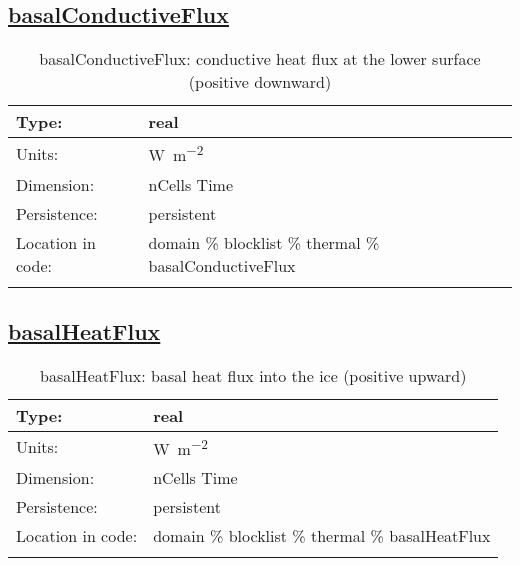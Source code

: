 \subsection[basalConductiveFlux]{\hyperref[sec:var_tab_thermal]{basalConductiveFlux}}
\label{subsec:var_sec_thermal_basalConductiveFlux}
\begin{center}
\begin{longtable}{| p{2.0in} | p{4.0in} |}
        \hline 
        Type: & real \\
        \hline 
        Units: & \si{W.m^{-2}} \\
        \hline 
        Dimension: & nCells Time \\
        \hline 
        Persistence: & persistent \\
        \hline 
         Location in code: & domain \% blocklist \% thermal \% basalConductiveFlux \\
         \hline 
    \caption{basalConductiveFlux: conductive heat flux at the lower surface (positive downward)}
\end{longtable}
\end{center}
\subsection[basalHeatFlux]{\hyperref[sec:var_tab_thermal]{basalHeatFlux}}
\label{subsec:var_sec_thermal_basalHeatFlux}
\begin{center}
\begin{longtable}{| p{2.0in} | p{4.0in} |}
        \hline 
        Type: & real \\
        \hline 
        Units: & \si{W.m^{-2}} \\
        \hline 
        Dimension: & nCells Time \\
        \hline 
        Persistence: & persistent \\
        \hline 
         Location in code: & domain \% blocklist \% thermal \% basalHeatFlux \\
         \hline 
    \caption{basalHeatFlux: basal heat flux into the ice (positive upward)}
\end{longtable}
\end{center}
